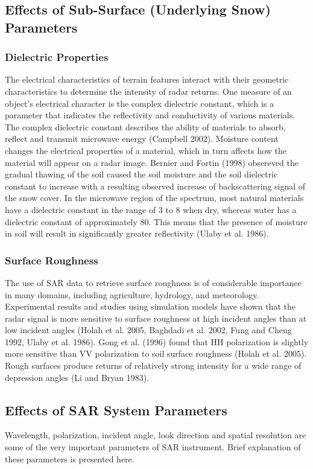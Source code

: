 \subsection{Effects of Sub-Surface (Underlying Snow) Parameters} 
\subsubsection{Dielectric Properties}
The electrical characteristics of terrain features interact with their geometric characteristics to determine the intensity of radar returns. One measure of an object’s electrical character is the complex dielectric constant, which is a parameter that indicates the reflectivity and conductivity of various materials. The complex dielectric constant describes the ability of materials to absorb, reflect and transmit microwave energy (Campbell 2002). Moisture content changes the electrical properties of a material, which in turn affects how the material will appear on a radar image. Bernier and Fortin (1998) obsereved the gradual thawing of the soil caused the soil moisture and the soil dielectric constant to increase  with a resulting observed increase of backscattering signal of the snow cover. In the microwave region of the spectrum, most natural materials have a dielectric constant in the range of 3 to 8 when dry, whereas water has a dielectric constant of approximately 80. This means that the presence of moisture in soil will result in significantly greater reflectivity (Ulaby et al. 1986).
\subsubsection{Surface Roughness}
The use of SAR data to retrieve surface roughness is of considerable importance in many domains, including agriculture, hydrology, and meteorology. Experimental results and studies using simulation models have shown that the radar signal is more sensitive to surface roughness at high incident angles than at low incident angles (Holah et al. 2005, Baghdadi et al.  2002, Fung and Cheng 1992, Ulaby et al. 1986). Gong et al. (1996) found that HH polarization is slightly more sensitive than VV polarization to soil surface roughness (Holah et al. 2005). Rough surfaces produce returns of relatively strong intensity for a wide range of depression angles (Li and Bryan 1983). 
\subsection{Effects of SAR System Parameters}  
Wavelength, polarization, incident angle, look direction and spatial resolution are some of the very important parameters of SAR instrument. Brief explanation of these parameters is presented here.
